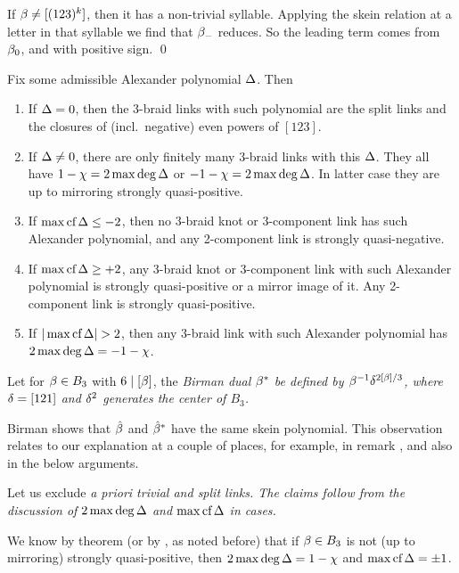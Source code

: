 If $\beta\ne [(123)^k]$, then it has a non-trivial syllable.
Applying the skein relation at a letter in that syllable
we find that $\beta_-$ reduces. So the leading term comes
from $\beta_0$, and with positive sign. \qed



\begin{theorem}\label{THA}
Fix some admissible Alexander polynomial $\Delta$. Then
\def\labelenumi{\theenumi)}
\begin{enumerate}
\item If $\Delta=0$, then the 3-braid links with such polynomial
are the split links and the closures of (incl.\ negative)
even powers of $[123]$.
\item If $\Delta\ne 0$, there are only finitely many 3-braid links
with this $\Delta$. They all have $1-\chi=2\max\deg\Delta$ or $-1-\chi=2\max\deg\Delta$.
In latter case they are up to mirroring strongly quasi-positive.
\item If $\max\text{\rm cf}\,\Delta\le -2$, then no 3-braid knot or 3-component
link has such Alexander polynomial, and any 2-component link
is strongly quasi-negative.
\item If $\max\text{\rm cf}\,\Delta\ge +2$, any 3-braid knot or 3-component link
with such Alexander polynomial is strongly quasi-positive or a
mirror image of it. Any 2-component link is strongly quasi-positive.
\item If $|\Mc\Dl|>2$, then any 3-braid link 
with such Alexander polynomial has $2\max\deg\Delta=-1-\chi$.
\end{enumerate}
\end{theorem}

\begin{defi}\label{DEFB}
Let for $\beta\in B_3$ with $6\mid [\beta]$, the \em{Birman dual}
$\beta^*$ be defined by $\beta^{-1}\delta^{2[\beta]/3}$, where
$\delta=[121]$ and $\delta^2$ generates the center of $B_3$.
\end{defi}

Birman \cite{Birman} shows that $\hat{\beta}$ and $\hat{\beta}^*$
have the same skein polynomial. This observation relates to
our explanation at a couple of places, for example, in remark
, and also in the below arguments.

Let us exclude \em{a priori} trivial and split links.  The claims
follow from the discussion of $2\max\deg\Delta$ and $\max\text{\rm cf}\,\Delta$ in cases.

We know by theorem  (or by \cite{3br,ntriv}, as noted
before) that if $\beta\in B_3$ is not (up to mirroring) strongly
quasi-positive, then $2\max\deg\Delta=1-\chi$ and $\max\text{\rm cf}\,\Delta=\pm 1$.

